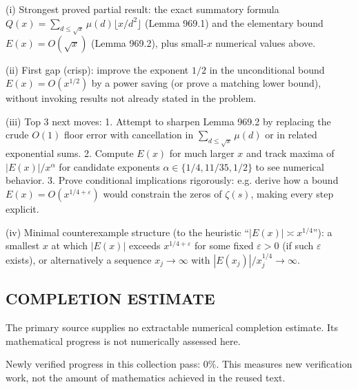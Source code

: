 (i) Strongest proved partial result: the exact summatory formula $Q(x)=\sum_{d\le\sqrt x}\mu(d)\lfloor x/d^2\rfloor$ (Lemma 969.1) and the elementary bound $E(x)=O(\sqrt x)$ (Lemma 969.2), plus small-$x$ numerical values above.

(ii) First gap (crisp): improve the exponent $1/2$ in the unconditional bound $E(x)=O(x^{1/2})$ by a power saving (or prove a matching lower bound), without invoking results not already stated in the problem.

(iii) Top 3 next moves:
1. Attempt to sharpen Lemma 969.2 by replacing the crude $O(1)$ floor error with cancellation in $\sum_{d\le\sqrt x}\mu(d)$ or in related exponential sums.
2. Compute $E(x)$ for much larger $x$ and track maxima of $|E(x)|/x^{\alpha}$ for candidate exponents $\alpha\in\{1/4,11/35,1/2\}$ to see numerical behavior.
3. Prove conditional implications rigorously: e.g. derive how a bound $E(x)=O(x^{1/4+\varepsilon})$ would constrain the zeros of $\zeta(s)$, making every step explicit.

(iv) Minimal counterexample structure (to the heuristic “$|E(x)|\asymp x^{1/4}$”): a smallest $x$ at which $|E(x)|$ exceeds $x^{1/4+\varepsilon}$ for some fixed $\varepsilon>0$ (if such $\varepsilon$ exists), or alternatively a sequence $x_j\to\infty$ with $|E(x_j)|/x_j^{1/4}\to\infty$.


\subsection*{COMPLETION ESTIMATE}
The primary source supplies no extractable numerical completion estimate. Its mathematical progress is not numerically assessed here.

Newly verified progress in this collection pass: $0\%$. This measures new verification work, not the amount of mathematics achieved in the reused text.
